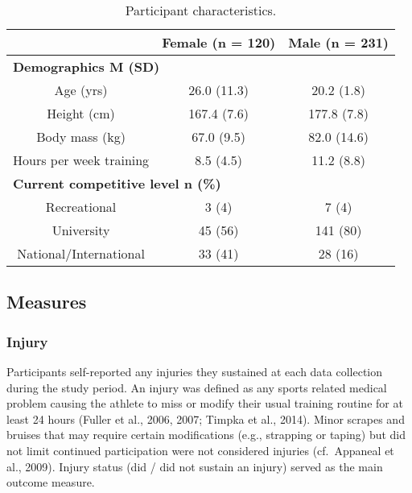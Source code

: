 \documentclass[
  english,
  man]{apa6}
\begin{document}
\begin{table}[H]

\caption{\label{tab:table1}Participant characteristics.}
\centering
\begin{tabular}[t]{c|c|c}
\hline
\textbf{ } & \textbf{Female (n = 120)} & \textbf{Male (n = 231)}\\
\hline
\multicolumn{3}{l}{\textbf{Demographics M (SD)}}\\
\hline
\hspace{1em}Age (yrs) & 26.0 (11.3) & 20.2 (1.8)\\
\hline
\hspace{1em}Height (cm) & 167.4 (7.6) & 177.8 (7.8)\\
\hline
\hspace{1em}Body mass (kg) & 67.0 (9.5) & 82.0 (14.6)\\
\hline
\hspace{1em}Hours per week training & 8.5 (4.5) & 11.2 (8.8)\\
\hline
\multicolumn{3}{l}{\textbf{Current competitive level n (\%)}}\\
\hline
\hspace{1em}Recreational & 3 (4) & 7 (4)\\
\hline
\hspace{1em}University & 45 (56) & 141 (80)\\
\hline
\hspace{1em}National/International & 33 (41) & 28 (16)\\
\hline
\end{tabular}
\end{table}

\hypertarget{measures}{%
\subsection{Measures}\label{measures}}

\hypertarget{injury}{%
\subsubsection{Injury}\label{injury}}

Participants self-reported any injuries they sustained at each data collection during the study period.
An injury was defined as any sports related medical problem causing the athlete to miss or modify their usual training routine for at least 24 hours (Fuller et al., 2006, 2007; Timpka et al., 2014).
Minor scrapes and bruises that may require certain modifications (e.g., strapping or taping) but did not limit continued participation were not considered injuries (cf.~Appaneal et al., 2009).
Injury status (did / did not sustain an injury) served as the main outcome measure.
\end{document}
